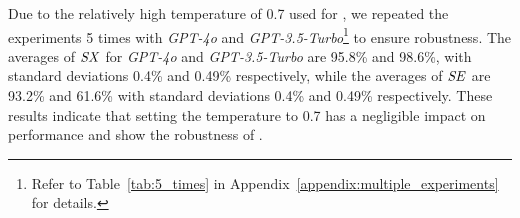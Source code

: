 Due to the relatively high temperature of 0.7 used for \NAME, we repeated the experiments 5 times with \textit{GPT-4o} and \textit{GPT-3.5-Turbo}\footnote{Refer to Table~\ref{tab:5_times} in Appendix~\ref{appendix:multiple_experiments} for details.} to ensure robustness. The averages of $\mathit{SX}$ for \textit{GPT-4o} and \textit{GPT-3.5-Turbo} are 95.8\% and 98.6\%, with standard deviations 0.4\% and 0.49\% respectively, while the averages of $\mathit{SE}$ are 93.2\% and 61.6\% with standard deviations 0.4\% and 0.49\% respectively. These results indicate that setting the temperature to 0.7 has a negligible impact on performance and show the robustness of \NAME.



